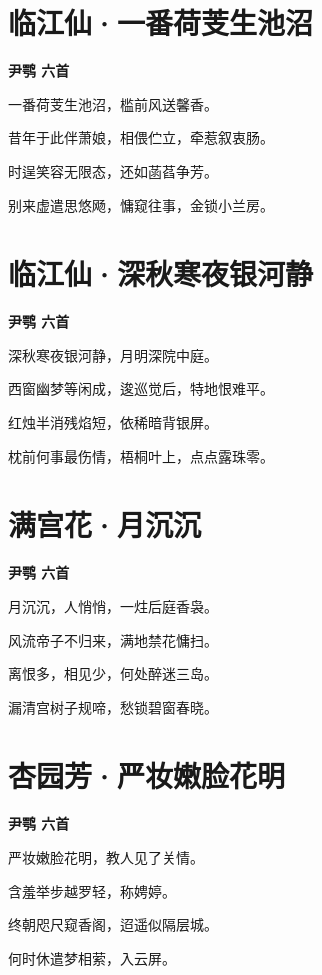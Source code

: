 \documentclass[12pt,a4paper]{ctexbook}
\begin{document}
\section{临江仙·一番荷芰生池沼}
\textbf{尹鹗 六首}\par\vspace{0.5em}
一番荷芰生池沼，槛前风送馨香。\par
昔年于此伴萧娘，相偎伫立，牵惹叙衷肠。\par
时逞笑容无限态，还如菡萏争芳。\par
别来虚遣思悠飏，慵窥往事，金锁小兰房。\par

\section{临江仙·深秋寒夜银河静}
\textbf{尹鹗 六首}\par\vspace{0.5em}
深秋寒夜银河静，月明深院中庭。\par
西窗幽梦等闲成，逡巡觉后，特地恨难平。\par
红烛半消残焰短，依稀暗背银屏。\par
枕前何事最伤情，梧桐叶上，点点露珠零。\par

\section{满宫花·月沉沉}
\textbf{尹鹗 六首}\par\vspace{0.5em}
月沉沉，人悄悄，一炷后庭香袅。\par
风流帝子不归来，满地禁花慵扫。\par
离恨多，相见少，何处醉迷三岛。\par
漏清宫树子规啼，愁锁碧窗春晓。\par

\section{杏园芳·严妆嫩脸花明}
\textbf{尹鹗 六首}\par\vspace{0.5em}
严妆嫩脸花明，教人见了关情。\par
含羞举步越罗轻，称娉婷。\par
终朝咫尺窥香阁，迢遥似隔层城。\par
何时休遣梦相萦，入云屏。\par
\end{document}
